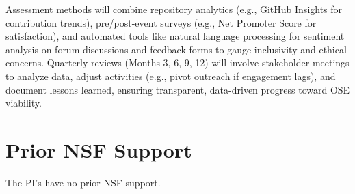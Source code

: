 \documentclass[11pt]{article}
\begin{document}
Assessment methods will combine repository analytics (e.g., GitHub Insights for contribution trends), pre/post-event surveys (e.g., Net Promoter Score for satisfaction), and automated tools like natural language processing for sentiment analysis on forum discussions and feedback forms to gauge inclusivity and ethical concerns. Quarterly reviews (Months 3, 6, 9, 12) will involve stakeholder meetings to analyze data, adjust activities (e.g., pivot outreach if engagement lags), and document lessons learned, ensuring transparent, data-driven progress toward OSE viability.
\vspace{-3pt}
\section*{Prior NSF Support}
\noindent
The PI's have no prior NSF support.
\newpage


\end{document}
